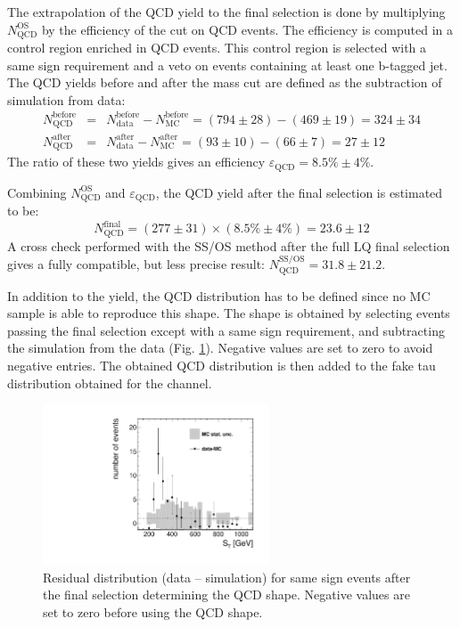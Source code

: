 The extrapolation of the QCD yield to the final selection is done by multiplying $N_{\text{QCD}}^{\text{OS}}$ by the efficiency of the \MassTJ cut on QCD events.
The efficiency is computed in a control region enriched in QCD events. This control region is selected with a same sign requirement and a veto on events containing at least one b-tagged jet. The QCD yields before and after the mass cut are defined as the subtraction of simulation from data:
\begin{eqnarray}
N_{\text{QCD}}^{\text{before}} & = & N_{\text{data}}^{\text{before}} - N_{\text{MC}}^{\text{before}} = (794\pm 28) - (469\pm 19) = 324\pm 34 \\
N_{\text{QCD}}^{\text{after}} & = & N_{\text{data}}^{\text{after}} - N_{\text{MC}}^{\text{after}} = (93\pm 10) - (66\pm 7) = 27\pm 12
\end{eqnarray}
The ratio of these two yields gives an efficiency $\varepsilon_{\text{QCD}} = 8.5\% \pm 4\%$.

Combining $N_{\text{QCD}}^{\text{OS}}$ and $\varepsilon_{\text{QCD}}$, the QCD yield after the final selection is estimated to be:
\begin{equation}
N_{\text{QCD}}^{\text{final}} = (277\pm 31) \times (8.5\% \pm 4\%) = 23.6 \pm 12 
\end{equation}
A cross check performed with the SS/OS method after the full LQ final selection gives a fully compatible, but less precise result: $N_{\text{QCD}}^{\text{SS/OS}} = 31.8 \pm 21.2$.

In addition to the yield, the QCD \ST distribution has to be defined since no MC sample is able to reproduce this shape. The shape is obtained by selecting events passing the final selection except with a same sign requirement, and subtracting the simulation from the data (Fig. \ref{fig:residQCD}). Negative values are set to zero to avoid negative entries. The obtained QCD \ST distribution is then added to the fake tau distribution obtained for the \etau channel.

\begin{figure}[htbp]
  \begin{center}
    \includegraphics[width=0.6\textwidth]{figures/bkgEstim/residualQCD.pdf}
    \caption{Residual distribution (data -- simulation) for same sign events after the final selection determining the QCD shape. Negative values are set to zero before using the QCD shape.}
    \label{fig:residQCD}
  \end{center}
\end{figure}

